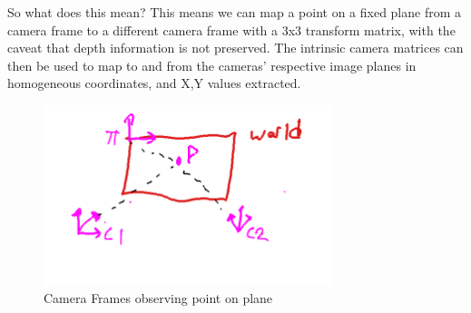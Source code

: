 \documentclass[12pt]{article}
\begin{document}
So what does this mean? This means we can map a point on a fixed plane from a camera frame to a different camera frame with a 3x3 transform matrix, with the caveat that depth information is not preserved. The intrinsic camera matrices can then be used to map to and from the cameras' respective image planes in homogeneous coordinates, and X,Y values extracted.

\begin{figure}[H]
\centering
\includegraphics[page=1,width=0.75\textwidth]{q1_1a}
\caption{ Camera Frames observing point on plane } 
\label{fig:autoencout}
\end{figure}   
\end{document}
